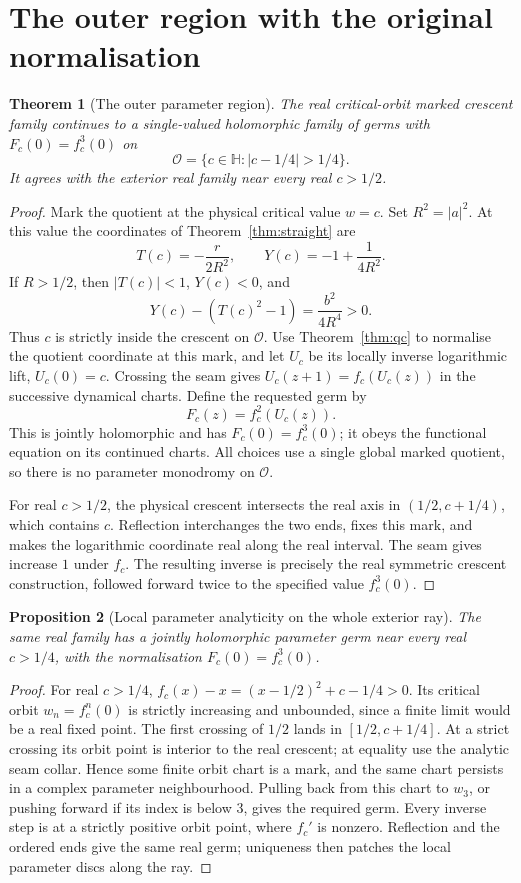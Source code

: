 \documentclass[11pt]{article}
\newtheorem{theorem}{Theorem}
\newtheorem{proposition}[theorem]{Proposition}
\newcommand{\HH}{\mathbb H}
\begin{document}
\section{The outer region with the original normalisation}
\begin{theorem}[The outer parameter region]\label{thm:outer}
The real critical-orbit marked crescent family continues to a single-valued
holomorphic family of germs with $F_c(0)=f_c^3(0)$ on
\[
 \mathcal O=\{c\in\HH:|c-1/4|>1/4\}.
\]
It agrees with the exterior real family near every real $c>1/2$.
\end{theorem}
\begin{proof}
Mark the quotient at the physical critical value $w=c$. Set $R^2=|a|^2$.
At this value the coordinates of Theorem~\ref{thm:straight} are
\[
 T(c)=-\frac{r}{2R^2},\qquad Y(c)=-1+\frac1{4R^2}.
\]
If $R>1/2$, then $|T(c)|<1$, $Y(c)<0$, and
\[
 Y(c)-(T(c)^2-1)=\frac{b^2}{4R^4}>0.
\]
Thus $c$ is strictly inside the crescent on $\mathcal O$. Use
Theorem~\ref{thm:qc} to normalise the quotient coordinate at this mark, and
let $U_c$ be its locally inverse logarithmic lift, $U_c(0)=c$.
Crossing the seam gives $U_c(z+1)=f_c(U_c(z))$ in the successive dynamical
charts. Define the requested germ by
\[
 F_c(z)=f_c^2(U_c(z)).
\]
This is jointly holomorphic and has $F_c(0)=f_c^3(0)$; it obeys the
functional equation on its continued charts. All choices use a single
global marked quotient, so there is no parameter monodromy on $\mathcal O$.

For real $c>1/2$, the physical crescent intersects the real axis in
$(1/2,c+1/4)$, which contains $c$. Reflection interchanges the two ends,
fixes this mark, and makes the logarithmic coordinate real along the
real interval. The seam gives increase $1$ under $f_c$. The resulting
inverse is precisely the real symmetric crescent construction, followed
forward twice to the specified value $f_c^3(0)$.
\end{proof}

\begin{proposition}[Local parameter analyticity on the whole exterior ray]
The same real family has a jointly holomorphic parameter germ near every
real $c>1/4$, with the normalisation $F_c(0)=f_c^3(0)$.
\end{proposition}
\begin{proof}
For real $c>1/4$, $f_c(x)-x=(x-1/2)^2+c-1/4>0$. Its critical orbit
$w_n=f_c^n(0)$ is strictly increasing and unbounded, since a finite limit
would be a real fixed point. The first crossing of $1/2$ lands in
$[1/2,c+1/4]$. At a strict crossing its orbit point is interior to the
real crescent; at equality use the analytic seam collar. Hence some finite
orbit chart is a mark, and the same chart persists in a complex parameter
neighbourhood. Pulling back from this chart to $w_3$, or pushing forward
if its index is below $3$, gives the required germ. Every inverse step is
at a strictly positive orbit point, where $f_c'$ is nonzero. Reflection and
the ordered ends give the same real germ; uniqueness then patches the
local parameter discs along the ray.
\end{proof}
\end{document}
